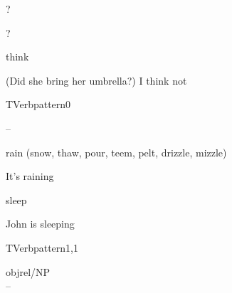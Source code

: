 
\begin{thetadescr}
\evitem ?
\esitem
     \begin{examples}
        \example ?
     \end{examples}
\end{thetadescr}



\begin{thetadescr}
\evitem think
\esitem
     \begin{examples}
        \example (Did she bring her umbrella?) I think not
     \end{examples}
\end{thetadescr}


\newpage
\verbpattern{[synNoVpArgs]}
\begin{vpattern}
 TVerbpattern0     
\csritem \mbox{}\\
     \begin{csr}
     --
     \end{csr}
\remarksitem
\end{vpattern}


\begin{thetadescr}
\evitem rain (snow, thaw, pour, teem, pelt, drizzle, mizzle)
\esitem
     \begin{examples}
        \example It's raining
     \end{examples}
\end{thetadescr}




\begin{thetadescr}
\evitem sleep
\esitem
     \begin{examples}
        \example John is sleeping
     \end{examples}
\end{thetadescr}


\newpage
\verbpattern{[synNP] }
\begin{vpattern}
 TVerbpattern1,1   
\csritem \mbox{}\\
     \begin{csr}
     objrel/NP\\
     --
     \end{csr}
\remarksitem
\end{vpattern}


